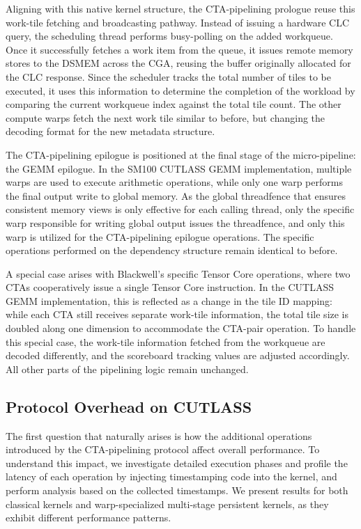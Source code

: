 Aligning with this native kernel structure, the CTA-pipelining prologue reuse this work-tile fetching and broadcasting pathway. Instead of issuing a hardware CLC query, the scheduling thread performs busy-polling on the added workqueue. Once it successfully fetches a work item from the queue, it issues remote memory stores to the DSMEM across the CGA, reusing the buffer originally allocated for the CLC response. Since the scheduler tracks the total number of tiles to be executed, it uses this information to determine the completion of the workload by comparing the current workqueue index against the total tile count. The other compute warps fetch the next work tile similar to before, but changing the decoding format for the new metadata structure.

The CTA-pipelining epilogue is positioned at the final stage of the micro-pipeline: the GEMM epilogue. In the SM100 CUTLASS GEMM implementation, multiple warps are used to execute arithmetic operations, while only one warp performs the final output write to global memory. As the global threadfence that ensures consistent memory views is only effective for each calling thread, only the specific warp responsible for writing global output issues the threadfence, and only this warp is utilized for the CTA-pipelining epilogue operations. The specific operations performed on the dependency structure remain identical to before.

A special case arises with Blackwell's specific Tensor Core operations, where two CTAs cooperatively issue a single Tensor Core instruction. In the CUTLASS GEMM implementation, this is reflected as a change in the tile ID mapping: while each CTA still receives separate work-tile information, the total tile size is doubled along one dimension to accommodate the CTA-pair operation. To handle this special case, the work-tile information fetched from the workqueue are decoded differently, and the scoreboard tracking values are adjusted accordingly. All other parts of the pipelining logic remain unchanged.

\subsection{Protocol Overhead on CUTLASS}

The first question that naturally arises is how the additional operations introduced by the CTA-pipelining protocol affect overall performance. To understand this impact, we investigate detailed execution phases and profile the latency of each operation by injecting timestamping code into the kernel, and perform analysis based on the collected timestamps. We present results for both classical kernels and warp-specialized multi-stage persistent kernels, as they exhibit different performance patterns. 

